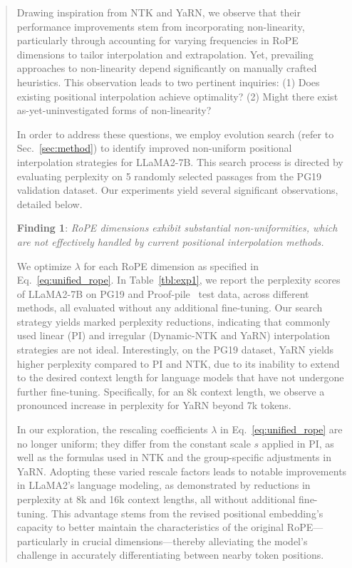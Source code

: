 \begin{abstract}
Drawing inspiration from NTK and YaRN, we observe that their performance improvements stem from incorporating non-linearity, particularly through accounting for varying frequencies in RoPE dimensions to tailor interpolation and extrapolation. Yet, prevailing approaches to non-linearity depend significantly on manually crafted heuristics. This observation leads to two pertinent inquiries: (1) Does existing positional interpolation achieve optimality? (2) Might there exist as-yet-uninvestigated forms of non-linearity?

In order to address these questions, we employ evolution search (refer to Sec.~\ref{sec:method}) to identify improved non-uniform positional interpolation strategies for LLaMA2-7B. This search process is directed by evaluating perplexity on 5 randomly selected passages from the PG19~\cite{pg19} validation dataset. Our experiments yield several significant observations, detailed below.

\textbf{Finding 1}: \textit{RoPE dimensions exhibit substantial non-uniformities, which are not effectively handled by current positional interpolation methods.}

We optimize $\lambda$ for each RoPE dimension as specified in Eq.~\ref{eq:unified_rope}. In Table~\ref{tbl:exp1}, we report the perplexity scores of LLaMA2-7B on PG19 and Proof-pile~\cite{proof-pile} test data, across different methods, all evaluated without any additional fine-tuning. Our search strategy yields marked perplexity reductions, indicating that commonly used linear (PI) and irregular (Dynamic-NTK and YaRN) interpolation strategies are not ideal. Interestingly, on the PG19 dataset, YaRN yields higher perplexity compared to PI and NTK, due to its inability to extend to the desired context length for language models that have not undergone further fine-tuning. Specifically, for an 8k context length, we observe a pronounced increase in perplexity for YaRN beyond 7k tokens.

In our exploration, the rescaling coefficients $\lambda$ in Eq.~\ref{eq:unified_rope} are no longer uniform; they differ from the constant scale $s$ applied in PI, as well as the formulas used in NTK and the group-specific adjustments in YaRN. Adopting these varied rescale factors leads to notable improvements in LLaMA2's language modeling, as demonstrated by reductions in perplexity at 8k and 16k context lengths, all without additional fine-tuning. This advantage stems from the revised positional embedding's capacity to better maintain the characteristics of the original RoPE—particularly in crucial dimensions—thereby alleviating the model's challenge in accurately differentiating between nearby token positions.


\end{abstract}
